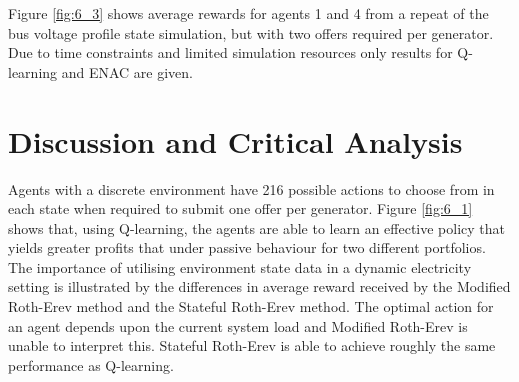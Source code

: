 
Figure \ref{fig:6_3} shows average rewards for agents 1 and 4 from a repeat of
the bus voltage profile state simulation, but with two offers required per
generator.  Due to time constraints and limited simulation resources only
results for Q-learning and ENAC are given.

\section{Discussion and Critical Analysis}
\label{sec:discuss}
Agents with a discrete environment have 216 possible actions to choose from in each state
when required to submit one offer per generator.  Figure \ref{fig:6_1} shows
that, using Q-learning, the agents are able to learn an effective policy that
yields greater profits that under passive behaviour for two different
portfolios.  The importance of utilising environment state data in a dynamic
electricity setting is illustrated by the differences in average reward received
by the Modified Roth-Erev method and the Stateful Roth-Erev method.  The optimal
action for an agent depends upon the current system load and Modified Roth-Erev
is unable to interpret this.  Stateful Roth-Erev is able to achieve roughly the
same performance as Q-learning.

